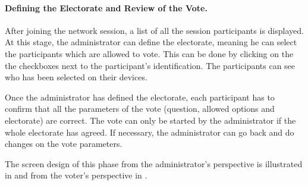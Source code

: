 \documentclass[numbers=noenddot, abstract=on, a4paper, headsepline,
footsepline, oneside, draft=off]{scrreprt}
\begin{document}
\paragraph{Defining the Electorate and Review of the Vote.}
After joining the network session, a list of all the session participants is
displayed. At this stage, the administrator can define the electorate, meaning
he can select the participants which are allowed to vote. This can be done by
clicking on the the checkboxes next to the participant's identification. The
participants can see who has been selected on their devices.

Once the administrator has defined the electorate, each participant has to
confirm that all the parameters of the vote (question, allowed options
and electorate) are correct. The vote can only be started by the administrator
if the whole electorate has agreed. If necessary, the administrator can go back and do changes on the vote parameters.

The screen design of this phase from the administrator's perspective is
illustrated in  and from the voter's perspective in
.
\end{document}
